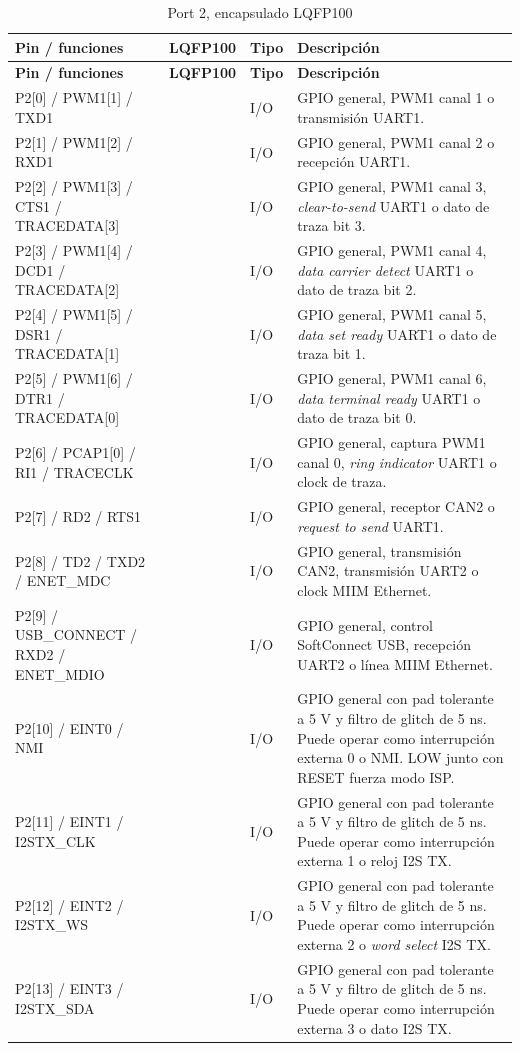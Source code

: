 ﻿\documentclass[11pt]{article}
\begin{document}
\begin{longtable}{|>{\raggedright\arraybackslash}p{}|>{\raggedright\arraybackslash}p{}|>{\raggedright\arraybackslash}p{}|>{\raggedright\arraybackslash}p{}|}
\caption{Port 2, encapsulado LQFP100}\\
\hline
\textbf{Pin / funciones} & \textbf{LQFP100} & \textbf{Tipo} & \textbf{Descripción} \\
\hline
\endfirsthead
\hline
\textbf{Pin / funciones} & \textbf{LQFP100} & \textbf{Tipo} & \textbf{Descripción} \\
\hline
\endhead
P2[0] / PWM1[1] / TXD1 & 73 & I/O & GPIO general, PWM1 canal 1 o transmisión UART1. \\
\hline
P2[1] / PWM1[2] / RXD1 & 74 & I/O & GPIO general, PWM1 canal 2 o recepción UART1. \\
\hline
P2[2] / PWM1[3] / CTS1 / TRACEDATA[3] & 75 & I/O & GPIO general, PWM1 canal 3, \textit{clear-to-send} UART1 o dato de traza bit 3. \\
\hline
P2[3] / PWM1[4] / DCD1 / TRACEDATA[2] & 76 & I/O & GPIO general, PWM1 canal 4, \textit{data carrier detect} UART1 o dato de traza bit 2. \\
\hline
P2[4] / PWM1[5] / DSR1 / TRACEDATA[1] & 69 & I/O & GPIO general, PWM1 canal 5, \textit{data set ready} UART1 o dato de traza bit 1. \\
\hline
P2[5] / PWM1[6] / DTR1 / TRACEDATA[0] & 68 & I/O & GPIO general, PWM1 canal 6, \textit{data terminal ready} UART1 o dato de traza bit 0. \\
\hline
P2[6] / PCAP1[0] / RI1 / TRACECLK & 67 & I/O & GPIO general, captura PWM1 canal 0, \textit{ring indicator} UART1 o clock de traza. \\
\hline
P2[7] / RD2 / RTS1 & 66 & I/O & GPIO general, receptor CAN2 o \textit{request to send} UART1. \\
\hline
P2[8] / TD2 / TXD2 / ENET\_MDC & 65 & I/O & GPIO general, transmisión CAN2, transmisión UART2 o clock MIIM Ethernet. \\
\hline
P2[9] / USB\_CONNECT / RXD2 / ENET\_MDIO & 64 & I/O & GPIO general, control SoftConnect USB, recepción UART2 o línea MIIM Ethernet. \\
\hline
P2[10] / EINT0 / NMI & 53 & I/O & GPIO general con pad tolerante a 5 V y filtro de glitch de 5 ns. Puede operar como interrupción externa 0 o NMI. LOW junto con RESET fuerza modo ISP. \\
\hline
P2[11] / EINT1 / I2STX\_CLK & 52 & I/O & GPIO general con pad tolerante a 5 V y filtro de glitch de 5 ns. Puede operar como interrupción externa 1 o reloj I2S TX. \\
\hline
P2[12] / EINT2 / I2STX\_WS & 51 & I/O & GPIO general con pad tolerante a 5 V y filtro de glitch de 5 ns. Puede operar como interrupción externa 2 o \textit{word select} I2S TX. \\
\hline
P2[13] / EINT3 / I2STX\_SDA & 50 & I/O & GPIO general con pad tolerante a 5 V y filtro de glitch de 5 ns. Puede operar como interrupción externa 3 o dato I2S TX. \\
\hline
\end{longtable}
\end{document}

